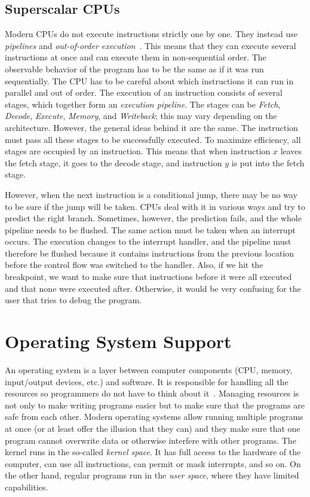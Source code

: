 \subsection{Superscalar CPUs}\label{section:superscalar-cpu}
Modern CPUs do not execute instructions strictly one by one. They instead use
\textit{pipelines} and \textit{out-of-order execution}~\cite{isa,
computer-architecture}. This means that they can execute several instructions
at once and can execute them in non-sequential order. The observable behavior
of the program has to be the same as if it was run sequentially. The CPU has to
be careful about which instructions it can run in parallel and out of order. The
execution of an instruction consists of several stages, which together form an
\textit{execution pipeline}. The stages can be \textit{Fetch}, \textit{Decode},
\textit{Execute}, \textit{Memory}, and \textit{Writeback}; this may vary
depending on the architecture. However, the general ideas behind it are the
same. The instruction must pass all these stages to be successfully executed.
To maximize efficiency, all stages are occupied by an instruction. This means
that when instruction $x$ leaves the fetch stage, it goes to the decode stage,
and instruction $y$ is put into the fetch stage.

However, when the next instruction is a conditional jump, there may be no way
to be sure if the jump will be taken. CPUs deal with it in various ways and try
to predict the right branch. Sometimes, however, the prediction fails, and the
whole pipeline needs to be flushed. The same action must be taken when an
interrupt occurs. The execution changes to the interrupt handler, and the
pipeline must therefore be flushed because it contains instructions from the
previous location before the control flow was switched to the handler. Also, if
we hit the breakpoint, we want to make sure that instructions before it were
all executed and that none were executed after. Otherwise, it would be very
confusing for the user that tries to debug the program.

\section{Operating System Support}
An operating system is a layer between computer components (CPU, memory,
input/output devices, etc.) and software. It is responsible for handling all
the resources so programmers do not have to think about it~\cite{modern-os,
os-concepts}. Managing resources is not only to make writing programs easier
but to make sure that the programs are safe from each other. Modern operating
systems allow running multiple programs at once (or at least offer the illusion
that they can) and they make sure that one program cannot overwrite data or
otherwise interfere with other programs. The kernel runs in the so-called
\textit{kernel space}. It has full access to the hardware of the computer, can
use all instructions, can permit or mask interrupts, and so on. On the other
hand, regular programs run in the \textit{user space}, where they have limited
capabilities.

